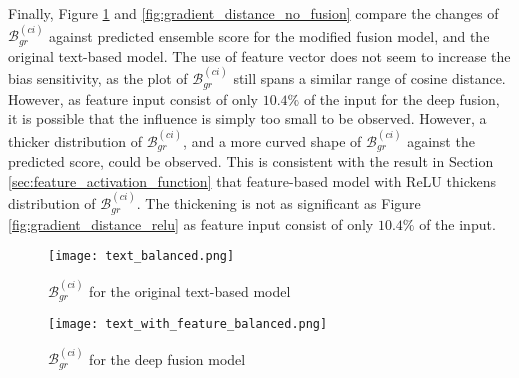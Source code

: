 Finally, Figure \ref{fig:gradient_distance_fusion} and \ref{fig:gradient_distance_no_fusion} compare the changes of $\mathcal{B}^{(ci)}_{gr}$ against predicted ensemble score for the modified fusion model, and the original text-based model. The use of feature vector does not seem to increase the bias sensitivity, as the plot of $\mathcal{B}_{gr}^{(ci)}$ still spans a similar range of cosine distance. However, as feature input consist of only $10.4\%$ of the input for the deep fusion, it is possible that the influence is simply too small to be observed. However, a thicker distribution of $\mathcal{B}_{gr}^{(ci)}$, and a more curved shape of $\mathcal{B}_{gr}^{(ci)}$ against the predicted score, could be observed. This is consistent with the result in Section \ref{sec:feature_activation_function} that feature-based model with ReLU thickens distribution of $\mathcal{B}_{gr}^{(ci)}$. The thickening is not as significant as Figure \ref{fig:gradient_distance_relu} as feature input consist of only $10.4\%$ of the input.

\begin{figure}[H]
    \centering
    \begin{minipage}[t]{0.48\textwidth}
        \centering
        \texttt{[image: text\_balanced.png]}
        \caption{$\mathcal{B}^{(ci)}_{gr}$ for the original text-based model}
        \label{fig:gradient_distance_no_fusion}
    \end{minipage}
    \hfill
    \begin{minipage}[t]{0.48\textwidth}
        \centering
        \texttt{[image: text\_with\_feature\_balanced.png]}
        \caption{$\mathcal{B}^{(ci)}_{gr}$ for the deep fusion model}
        \label{fig:gradient_distance_fusion}
    \end{minipage}
\end{figure}



